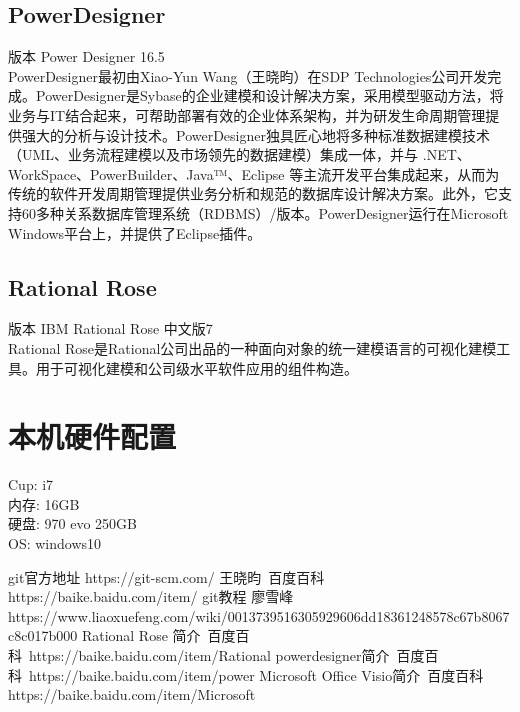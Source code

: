 \documentclass{article}
\begin{document}
	\subsection{PowerDesigner}
	版本 Power Designer 16.5\\
	PowerDesigner最初由Xiao-Yun Wang（王晓昀）在SDP Technologies公司开发完成。PowerDesigner是Sybase的企业建模和设计解决方案，采用模型驱动方法，将业务与IT结合起来，可帮助部署有效的企业体系架构，并为研发生命周期管理提供强大的分析与设计技术。PowerDesigner独具匠心地将多种标准数据建模技术（UML、业务流程建模以及市场领先的数据建模）集成一体，并与 .NET、WorkSpace、PowerBuilder、Java™、Eclipse 等主流开发平台集成起来，从而为传统的软件开发周期管理提供业务分析和规范的数据库设计解决方案。此外，它支持60多种关系数据库管理系统（RDBMS）/版本。PowerDesigner运行在Microsoft Windows平台上，并提供了Eclipse插件。
	\subsection{Rational Rose}
	版本 IBM Rational Rose 中文版7\\
	Rational Rose是Rational公司出品的一种面向对象的统一建模语言的可视化建模工具。用于可视化建模和公司级水平软件应用的组件构造。
	\section{本机硬件配置}
	Cup:  i7\\
	内存: 16GB\\
	硬盘: 970 evo 250GB\\
	OS: windows10\\
	\begin{thebibliography}{99}
		\bibitem{}git官方地址 https://git-scm.com/
		\bibitem{}王晓昀\ 百度百科 https://baike.baidu.com/item/%
		\bibitem{}git教程 廖雪峰
		\\ https://www.liaoxuefeng.com/wiki/0013739516305929606dd18361248578c67b8067c8c017b000
		\bibitem{}Rational Rose 简介\ 百度百科\ https://baike.baidu.com/item/Rational%
		\bibitem{}powerdesigner简介\ 百度百科\ https://baike.baidu.com/item/power%
		\bibitem{}Microsoft Office Visio简介\ 百度百科 \\ https://baike.baidu.com/item/Microsoft%
		
	\end{thebibliography}
\end{document}
